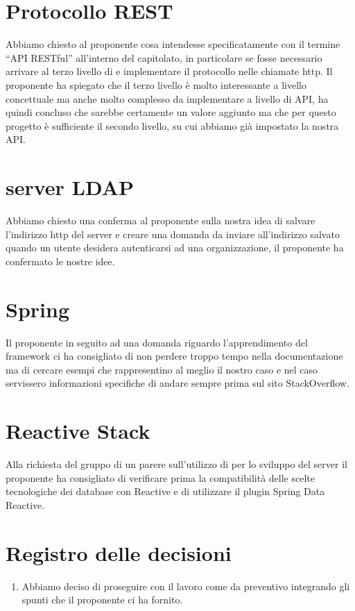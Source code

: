 \documentclass{article}
\begin{document}
\section{Protocollo REST}%
\label{sec:protocollo_rest}
Abbiamo chiesto al proponente cosa intendesse specificatamente con il termine ``API RESTful'' all'interno del capitolato, in particolare se fosse necessario arrivare al terzo livello di  e implementare il protocollo  nelle chiamate http.
Il proponente ha spiegato che il terzo livello è molto interessante a livello concettuale ma anche molto complesso da implementare a livello di API, ha quindi concluso che sarebbe certamente un valore aggiunto ma che per questo progetto è sufficiente il secondo livello, su cui abbiamo già impostato la nostra API\@.

\section{server LDAP}%
\label{sec:server_ldap}
Abbiamo chiesto una conferma al proponente sulla nostra idea di salvare l'indirizzo http del server  e creare una domanda da inviare all'indirizzo salvato quando un utente desidera autenticarsi ad una organizzazione, il proponente ha confermato le nostre idee.

\section{Spring}%
\label{sec:spring}
Il proponente in seguito ad una domanda riguardo l'apprendimento del framework  ci ha consigliato di non perdere troppo tempo nella documentazione ma di cercare esempi che rappresentino al meglio il nostro caso e nel caso servissero informazioni specifiche di andare sempre prima sul sito StackOverflow.

\section{Reactive Stack}%
\label{sec:reactive_stack}
Alla richiesta del gruppo di un parere sull'utilizzo di  per lo sviluppo del server il proponente ha consigliato di verificare prima la compatibilità delle scelte tecnologiche dei database con Reactive e di utilizzare il plugin Spring Data Reactive.


\newpage
\section{Registro delle decisioni}%
\label{sec:registro_delle_decisioni}

\begin{enumerate}
  \item Abbiamo deciso di proseguire con il lavoro come da preventivo integrando gli spunti che il proponente ci ha fornito.
\end{enumerate}
\end{document}
